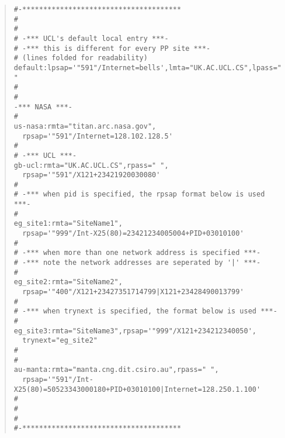 \begin{quote}\footnotesize\begin{verbatim}
#-**************************************
#
#
# -*** UCL's default local entry ***- 
# -*** this is different for every PP site ***- 
# (lines folded for readability)
default:lpsap='"591"/Internet=bells',lmta="UK.AC.UCL.CS",lpass=" "
#
#
-*** NASA ***-
#
us-nasa:rmta="titan.arc.nasa.gov",
  rpsap='"591"/Internet=128.102.128.5'
#
# -*** UCL ***-
gb-ucl:rmta="UK.AC.UCL.CS",rpass=" ",
  rpsap='"591"/X121+23421920030080'
#
# -*** when pid is specified, the rpsap format below is used ***-
#
eg_site1:rmta="SiteName1",
  rpsap='"999"/Int-X25(80)=23421234005004+PID+03010100'
#
# -*** when more than one network address is specified ***-
# -*** note the network addresses are seperated by '|' ***-
#
eg_site2:rmta="SiteName2",
  rpsap='"400"/X121+23427351714799|X121+23428490013799'
#
# -*** when trynext is specified, the format below is used ***-
#
eg_site3:rmta="SiteName3",rpsap='"999"/X121+234212340050',
  trynext="eg_site2"
#
# 
au-manta:rmta="manta.cng.dit.csiro.au",rpass=" ",
  rpsap='"591"/Int-X25(80)=50523343000180+PID+03010100|Internet=128.250.1.100'
#
#
#
#-**************************************
\end{verbatim}\end{quote}
